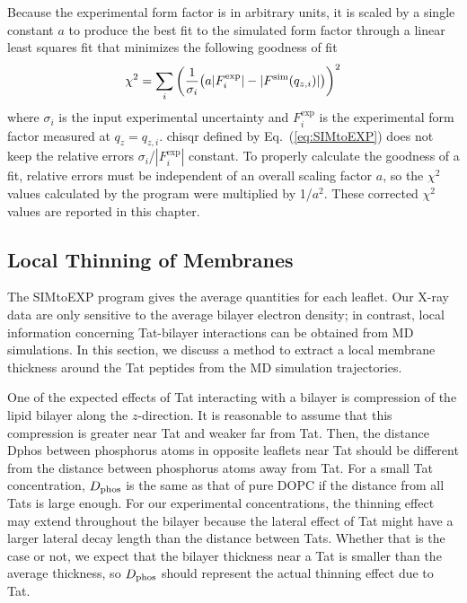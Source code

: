Because the experimental form factor is in arbitrary units, it is 
scaled by a single constant $a$ to produce the best fit to the simulated
form factor through a linear least squares fit that minimizes the 
following goodness of fit
\begin{equation}
  \chi^2 = \sum_i \left(\frac{1}{\sigma_i}\mathopen{}\left( 
    a|F^\textrm{exp}_i| - |F^\textrm{sim}(q_{z,i})|
   \right)\mathclose{}\right)^2
  \label{eq:SIMtoEXP}
\end{equation}
where $\sigma_i$ is the input experimental uncertainty and $F_i^\textrm{exp}$
is the experimental form factor measured at $q_z = q_{z,i}$.
\gls{chisqr} defined by Eq.~(\ref{eq:SIMtoEXP}) does not keep the relative errors
$\sigma_i$/$|F_i^\textrm{exp}|$ constant. 
To properly calculate the goodness of a fit, relative errors must be 
independent of an overall scaling factor $a$, so
the $\chi^2$ values calculated by the program were multiplied by 1/$a^2$. 
These corrected $\chi^2$ values are reported in this chapter.

\subsection{Local Thinning of Membranes}\label{sec:local_thinning}
The SIMtoEXP program gives the average quantities for each leaflet. 
Our X-ray data are only sensitive to the average bilayer electron density;
in contrast, local information concerning Tat-bilayer interactions can be obtained from MD simulations.
In this section, we discuss a method to extract a local membrane thickness
around the Tat peptides from the MD simulation trajectories. 

One of the expected effects of Tat interacting with a bilayer is 
compression of the lipid bilayer along the $z$-direction. It is 
reasonable to assume that this compression is greater near Tat and
weaker far from Tat.
Then, the distance \gls{Dphos} between phosphorus atoms in opposite
leaflets near Tat should be different from the distance between
phosphorus atoms away from Tat.  
For a small Tat concentration, $D_\text{phos}$ is the same as that of 
pure DOPC if the distance from all Tats is large enough.  
For our experimental concentrations, the thinning effect may extend throughout 
the bilayer because the lateral effect of Tat might have a larger lateral decay 
length than the distance between Tats. Whether that is the case or not, we 
expect that the bilayer thickness near a Tat is smaller than the average thickness,
so $D_\text{phos}$ should represent the actual thinning effect due to Tat. 

